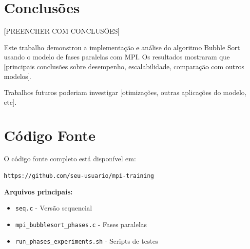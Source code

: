 \documentclass[10pt,twocolumn]{article}
\begin{document}
\section{Conclusões}

[PREENCHER COM CONCLUSÕES]

Este trabalho demonstrou a implementação e análise do algoritmo Bubble Sort usando o modelo de fases paralelas com MPI. Os resultados mostraram que [principais conclusões sobre desempenho, escalabilidade, comparação com outros modelos].

Trabalhos futuros poderiam investigar [otimizações, outras aplicações do modelo, etc].

\section*{Código Fonte}

O código fonte completo está disponível em:

\texttt{https://github.com/seu-usuario/mpi-training}

\vspace{0.5em}

\textbf{Arquivos principais:}
\begin{itemize}
    \item \texttt{seq.c} - Versão sequencial
    \item \texttt{mpi\_bubblesort\_phases.c} - Fases paralelas
    \item \texttt{run\_phases\_experiments.sh} - Scripts de testes
\end{itemize}
\end{document}

